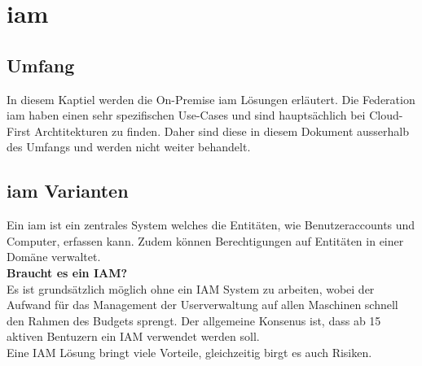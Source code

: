 \chapter{\acrfull{iam}}


\section{Umfang}
In diesem Kaptiel werden die On-Premise \acrfull{iam} Lösungen erläutert.
Die Federation \acrshort{iam} haben einen sehr spezifischen Use-Cases und sind hauptsächlich bei Cloud-First Archtitekturen zu finden. Daher sind diese in diesem Dokument ausserhalb des Umfangs und werden nicht weiter behandelt.

\section{\acrshort{iam} Varianten}
Ein \acrfull{iam} ist ein zentrales System welches die Entitäten, wie Benutzeraccounts und Computer, erfassen kann. Zudem können Berechtigungen auf Entitäten in einer Domäne verwaltet.\\

\textbf{Braucht es ein IAM?}\\
Es ist grundsätzlich möglich ohne ein IAM System zu arbeiten, wobei der Aufwand für das Management der Userverwaltung auf allen Maschinen schnell den Rahmen des Budgets sprengt.
Der allgemeine Konsenus ist, dass ab 15 aktiven Bentuzern ein IAM verwendet werden soll.\\

Eine IAM Lösung bringt viele Vorteile, gleichzeitig birgt es auch Risiken.\\

